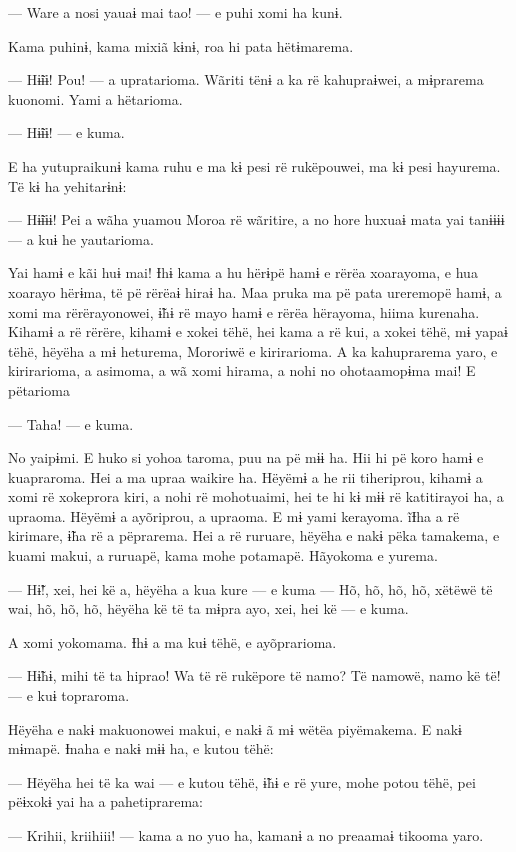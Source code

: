 — Ware a nosi yauaɨ mai tao! --- e puhi xomi ha kunɨ. 

Kama puhinɨ, kama mixiã kɨnɨ, roa hi pata hëtɨmarema. 

— Hɨ̃ɨɨ! Pou! --- a upratarioma. Wãriti tënɨ a ka rë kahupraɨwei, a
mɨprarema kuonomi. Yami a hëtarioma. 

— Hɨ̃ɨɨ! --- e kuma. 

E ha yutupraikunɨ kama ruhu e ma kɨ pesi rë rukëpouwei, ma kɨ pesi
hayurema. Të kɨ ha yehitarɨnɨ: 

— Hɨ̃ɨɨɨ! Pei a wãha yuamou Moroa rë wãritire, a no hore huxuaɨ mata yai
tanɨɨɨɨ --- a kuɨ he yautarioma. 

Yai hamɨ e kãi huɨ mai! Ɨhɨ kama a hu hërɨpë hamɨ e rërëa xoarayoma, e
hua xoarayo hërɨma, të pë rërëaɨ hiraɨ ha. Maa pruka ma pë pata
ureremopë hamɨ, a xomi ma rërërayonowei, ɨ̃hɨ rë mayo hamɨ e rërëa
hërayoma, hiima kurenaha. Kihamɨ a rë rërëre, kihamɨ e xokei tëhë, hei
kama a rë kui, a xokei tëhë, mɨ yapaɨ tëhë, hëyëha a mɨ heturema,
Mororiwë e kirirarioma. A ka kahuprarema yaro, e kirirarioma, a asimoma,
a wã xomi hirama, a nohi no ohotaamopɨma mai! E pëtarioma 

— Taha! --- e kuma. 

No yaipɨmi. E huko si yohoa taroma, puu na pë mɨɨ ha. Hii hi pë koro
hamɨ e kuapraroma. Hei a ma upraa waikire ha. Hëyëmɨ a he rii
tiheriprou, kihamɨ a xomi rë xokeprora kiri, a nohi rë mohotuaimi, hei
te hi kɨ mɨɨ rë katitirayoi ha, a upraoma. Hëyëmɨ a ayõriprou, a
upraoma. E mɨ yami kerayoma. ĩƗha a rë kirimare, ɨ̃ha rë a pëprarema. Hei
a rë ruruare, hëyëha e nakɨ pëka tamakema, e kuami makui, a ruruapë,
kama mohe potamapë. Hãyokoma e yurema. 

— Hɨ̃!, xei, hei kë a, hëyëha a kua kure --- e kuma --- Hõ, hõ, hõ, hõ,
xëtëwë të wai, hõ, hõ, hõ, hëyëha kë të ta mɨpra ayo, xei, hei kë --- e
kuma. 

A xomi yokomama. Ɨhɨ a ma kuɨ tëhë, e ayõprarioma. 

— Hɨ̃hɨ, mihi të ta hiprao! Wa të rë rukëpore të namo? Të namowë, namo kë
të! --- e kuɨ topraroma. 

Hëyëha e nakɨ makuonowei makui, e nakɨ ã mɨ wëtëa piyëmakema. E nakɨ
mɨmapë. Ɨnaha e nakɨ mɨɨ ha, e kutou tëhë: 

— Hëyëha hei të ka wai --- e kutou tëhë, ɨ̃hɨ e rë yure, mohe potou tëhë,
pei pëɨxokɨ yai ha a pahetiprarema:

— Krihii, kriihiii! --- kama a no yuo ha, kamanɨ a no preaamaɨ tikooma
yaro. 

